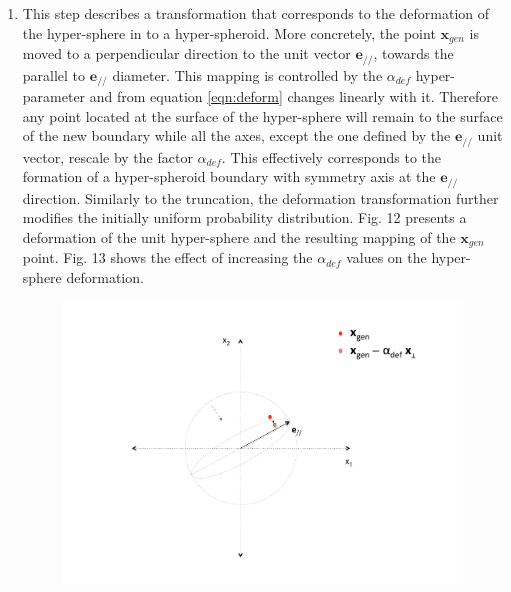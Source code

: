 \documentclass[parskip=full]{scrartcl}
\begin{document}
\begin{enumerate}
	\item This step describes a transformation that corresponds to the
	deformation of the hyper-sphere in to a hyper-spheroid. More concretely, the
	point \( \textbf{x}_{gen} \) is moved to a perpendicular direction to the
	unit vector \( \textbf{e}_{\scriptscriptstyle//} \), towards the parallel to
	\( \textbf{e}_{\scriptscriptstyle//} \) diameter. This mapping is controlled
	by the \( \alpha_{def} \) hyper-parameter and from equation
	\eqref{eqn:deform} changes linearly with it. Therefore any point located at
	the surface of the hyper-sphere will remain to the surface of the new
	boundary while all the axes, except the one defined by the
	\(\textbf{e}_{\scriptscriptstyle//} \) unit vector, rescale by the factor
	\(\alpha_{def} \). This effectively corresponds to the formation of a
	hyper-spheroid boundary with symmetry axis at the
	\(\textbf{e}_{\scriptscriptstyle//} \) direction. Similarly to the
	truncation, the deformation transformation further modifies the initially
	uniform probability distribution. Fig. 12 presents a deformation of the unit
	hyper-sphere and the resulting mapping of the \( \textbf{x}_{gen} \) point.
	Fig. 13 shows the effect of increasing the \( \alpha_{def} \) values on the
	hyper-sphere deformation.

	\begin{figure}[H]
		\centering
		\includegraphics[width=12cm, keepaspectratio]{./artifacts/fig12}
	\end{figure}
	

\end{enumerate}
\end{document}

